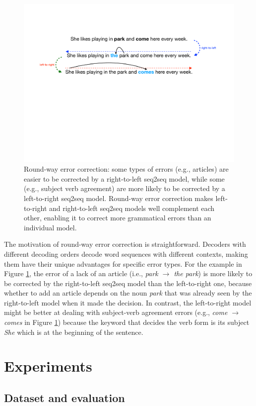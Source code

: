 \documentclass{article} %
\begin{document}
\begin{figure}
\centering
\includegraphics[width=12cm]{figures/round-way-check-ex.pdf}
\caption{Round-way error correction: some types of errors (e.g., articles) are easier to be corrected by a right-to-left seq2seq model, while some (e.g., subject verb agreement) are more likely to be corrected by a left-to-right seq2seq model. Round-way error correction makes left-to-right and right-to-left seq2seq models well complement each other, enabling it to correct more grammatical errors than an individual model.}\label{fig:round}
\end{figure}

The motivation of round-way error correction is straightforward. Decoders with different decoding orders decode word sequences with different contexts, making them have their unique advantages for specific error types. For the example in Figure \ref{fig:round}, the error of a lack of an article (i.e., \textit{park $\to$ the park}) is more likely to be corrected by the right-to-left seq2seq model than the left-to-right one, because whether to add an article depends on the noun \textit{park} that was already seen by the right-to-left model when it made the decision. In contrast, the left-to-right
model might be better at dealing with subject-verb agreement errors (e.g., \textit{come $\to$ comes} in Figure \ref{fig:round}) because the keyword that decides the verb form is its subject \textit{She} which is at the beginning of the sentence.

\section{Experiments}
\subsection{Dataset and evaluation}\label{subsec:data}
\end{document}
